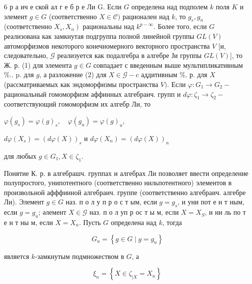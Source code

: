 \documentclass[10pt]{article}
\begin{document}
6 р а ич е ской ал г е б р е Ли G. Если $G$ определена над подполем $k$ поля $K$ и элемент $g \in G$ (соответственно $X \in \mathscr{C})$ рационален над $k$, то $g_{s}, g_{n}$ (соответственно $\left.X_{s}, X_{n}\right)$ рациональны над $k^{p-\infty}$. Более того, если $G$ реализована как замкнутая подгруппа полной линейной группы $G L(V)$ автоморфизмов некоторого конечномерного векторного пространства $V$ [и, следовательно, $\mathcal{G}$ реализуется как подалгебра в алгебре Ји группы $G L(V)]$, то Ж. р. (1) для элемента $g \in G$ совпадает с введенным выше мультипликативным \%.. p. для $g$, а разложение (2) для $X \in \mathscr{G}-\mathrm{c}$ аддитивным \%. р. для $X$ (рассматриваемых как эндоморфизмы пространства $V)$. Если $\varphi: G_{1} \rightarrow G_{2}-$ рациональный гомоморфизм аффинных алгебраич. групп и $d \varphi: \mathscr{\zeta}_{1} \rightarrow \mathscr{\zeta}_{2}-$ соответствующий гомоморфизм их алгебр Ли, то



$\varphi\left(g_{s}\right)=\varphi(g)_{s}, \quad \varphi\left(g_{u}\right)=\varphi(g)_{u}$,



$d \varphi\left(X_{s}\right)=(d \varphi(X))_{s}$ и $d \varphi\left(X_{n}\right)=(d \varphi(X))_{n}$



для любых $g \in G_{1}, X \in \mathscr{\zeta}_{1}$.



Понятие К. р. в алгебрашч. группах и алгебрах Ли позволяет ввести определение полупростого, унипотентного (соответственно нильпотентного) элементов в произвольной афффинной алгебраич. группе (соответственно алгебраич. алгебре Ли). Элемент $g \in G$ наз. п о л у п р о с т ым, если $g=g_{s}$, и уни пот е н т ным, если $g=g_{u}$; әлемент $X \in \mathcal{G}$ наз. п о л уп р ос т ы м, если $X=X_{S}$, и ни ль по т е н т ны м, если $X=X_{n}$. Пусть $G$ определена над $k$, тогда



\[

G_{u}=\left\{g \in G \mid g=g_{u}\right\}

\]



является $k$-замкнутым подмножеством в $G$, а



\[

\xi_{n}=\left\{X \in \zeta_{\mid X}=X_{n}\right\}

\]
\end{document}
